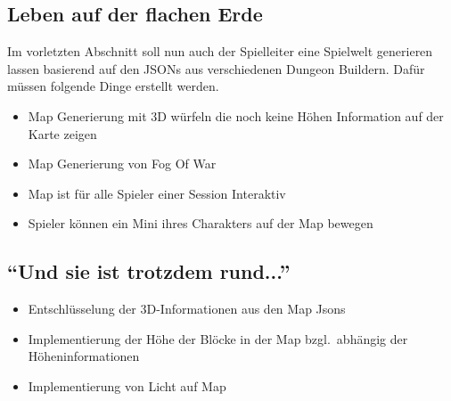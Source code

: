 \subsection{Leben auf der flachen Erde}\label{subsec:flat_earth_society_is_real}
Im vorletzten Abschnitt soll nun auch der Spielleiter eine Spielwelt generieren lassen basierend auf den JSONs aus
verschiedenen Dungeon Buildern.
Dafür müssen folgende Dinge erstellt werden.

\begin{itemize}
    \item Map Generierung mit 3D würfeln die noch keine Höhen Information auf der Karte zeigen
    \item Map Generierung von Fog Of War
    \item Map ist für alle Spieler einer Session Interaktiv
    \item Spieler können ein Mini ihres Charakters auf der Map bewegen
\end{itemize}

\subsection{\enquote{Und sie ist trotzdem rund...}}\label{subsec:gallileo_approves_this_world}
\begin{itemize}
    \item Entschlüsselung der 3D-Informationen aus den Map Jsons
    \item Implementierung der Höhe der Blöcke in der Map bzgl.\ abhängig der Höheninformationen
    \item Implementierung von Licht auf Map
\end{itemize}


